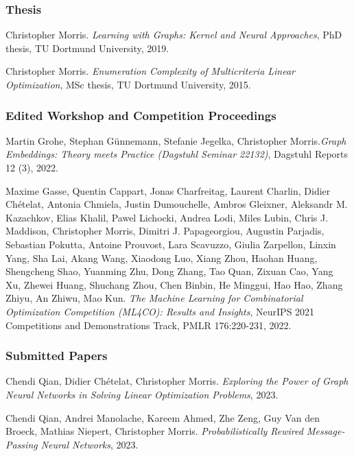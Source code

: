 \documentclass[11pt, a4paper, DIV=14, headings=small]{scrartcl}
\begin{document}
\begin{thebibliography}{15}
		\subsubsection*{Thesis}
		
		Christopher Morris.
		\emph{Learning with Graphs: Kernel and Neural Approaches}, PhD thesis, TU Dortmund University, 2019.
		
		Christopher Morris.
		\emph{Enumeration Complexity of Multicriteria Linear Optimization}, MSc thesis, TU Dortmund University, 2015.
		
		\subsubsection*{Edited Workshop and Competition Proceedings}
		
		Martin Grohe, Stephan Günnemann, Stefanie Jegelka, Christopher Morris.\footnotemark[2]
		\emph{Graph Embeddings: Theory meets Practice (Dagstuhl Seminar 22132)},
		Dagstuhl Reports 12 (3), 2022.
		
		Maxime Gasse, Quentin Cappart, Jonas Charfreitag, Laurent Charlin, Didier Chételat, Antonia Chmiela, Justin Dumouchelle, Ambros Gleixner, Aleksandr M. Kazachkov, Elias Khalil, Pawel Lichocki, Andrea Lodi, Miles Lubin, Chris J. Maddison, Christopher Morris, Dimitri J. Papageorgiou, Augustin Parjadis, Sebastian Pokutta, Antoine Prouvost, Lara Scavuzzo, Giulia Zarpellon, Linxin Yang, Sha Lai, Akang Wang, Xiaodong Luo, Xiang Zhou, Haohan Huang, Shengcheng Shao, Yuanming Zhu, Dong Zhang, Tao Quan, Zixuan Cao, Yang Xu, Zhewei Huang, Shuchang Zhou, Chen Binbin, He Minggui, Hao Hao, Zhang Zhiyu, An Zhiwu, Mao Kun.
		\emph{The Machine Learning for Combinatorial Optimization Competition (ML4CO): Results and Insights}, NeurIPS 2021 Competitions and Demonstrations Track, PMLR 176:220-231, 2022.
		
		\subsubsection*{Submitted Papers}
		Chendi Qian, Didier Chételat, Christopher Morris.
		\emph{Exploring the Power of Graph Neural Networks in Solving Linear Optimization Problems}, 2023.
				
		Chendi Qian, Andrei Manolache, Kareem Ahmed, Zhe Zeng, Guy Van den Broeck, Mathias Niepert, Christopher Morris.
		\emph{Probabilistically Rewired Message-Passing Neural Networks}, 2023.
		

\end{thebibliography}
\end{document}
